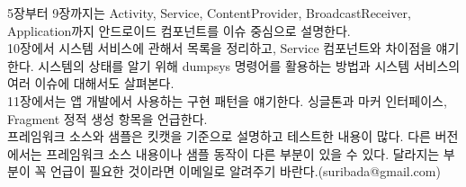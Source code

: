 \documentclass[a4paper,hidelinks,10pt,openany]{book} %
\begin{document}
5장부터 9장까지는 Activity, Service, ContentProvider, BroadcastReceiver, Application까지 안드로이드 컴포넌트를 이슈 중심으로 설명한다.\\

10장에서 시스템 서비스에 관해서 목록을 정리하고, Service 컴포넌트와 차이점을 얘기한다. 시스템의 상태를 알기 위해 dumpsys 명령어를 활용하는 방법과 시스템 서비스의 여러 이슈에 대해서도 살펴본다.\\

11장에서는 앱 개발에서 사용하는 구현 패턴을 얘기한다. 싱글톤과 마커 인터페이스, Fragment 정적 생성 항목을 언급한다.\\

프레임워크 소스와 샘플은 킷캣을 기준으로 설명하고 테스트한 내용이 많다. 다른 버전에서는 프레임워크 소스 내용이나 샘플 동작이 다른 부분이 있을 수 있다. 달라지는 부분이 꼭 언급이 필요한 것이라면 이메일로 알려주기 바란다.(suribada@gmail.com)









%









\ 
%

%
%




\end{document}
